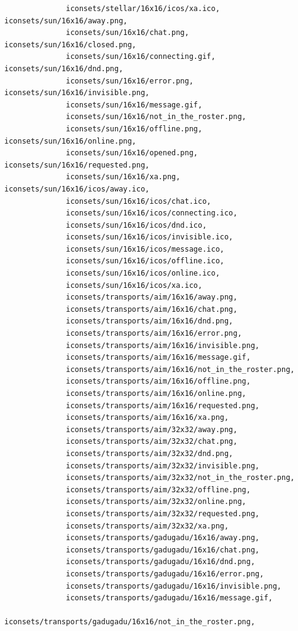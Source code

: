 \documentclass[a4paper]{article}
\begin{document}
\begin{verbatim}
              iconsets/stellar/16x16/icos/xa.ico, iconsets/sun/16x16/away.png,
              iconsets/sun/16x16/chat.png, iconsets/sun/16x16/closed.png,
              iconsets/sun/16x16/connecting.gif, iconsets/sun/16x16/dnd.png,
              iconsets/sun/16x16/error.png, iconsets/sun/16x16/invisible.png,
              iconsets/sun/16x16/message.gif,
              iconsets/sun/16x16/not_in_the_roster.png,
              iconsets/sun/16x16/offline.png, iconsets/sun/16x16/online.png,
              iconsets/sun/16x16/opened.png, iconsets/sun/16x16/requested.png,
              iconsets/sun/16x16/xa.png, iconsets/sun/16x16/icos/away.ico,
              iconsets/sun/16x16/icos/chat.ico,
              iconsets/sun/16x16/icos/connecting.ico,
              iconsets/sun/16x16/icos/dnd.ico,
              iconsets/sun/16x16/icos/invisible.ico,
              iconsets/sun/16x16/icos/message.ico,
              iconsets/sun/16x16/icos/offline.ico,
              iconsets/sun/16x16/icos/online.ico,
              iconsets/sun/16x16/icos/xa.ico,
              iconsets/transports/aim/16x16/away.png,
              iconsets/transports/aim/16x16/chat.png,
              iconsets/transports/aim/16x16/dnd.png,
              iconsets/transports/aim/16x16/error.png,
              iconsets/transports/aim/16x16/invisible.png,
              iconsets/transports/aim/16x16/message.gif,
              iconsets/transports/aim/16x16/not_in_the_roster.png,
              iconsets/transports/aim/16x16/offline.png,
              iconsets/transports/aim/16x16/online.png,
              iconsets/transports/aim/16x16/requested.png,
              iconsets/transports/aim/16x16/xa.png,
              iconsets/transports/aim/32x32/away.png,
              iconsets/transports/aim/32x32/chat.png,
              iconsets/transports/aim/32x32/dnd.png,
              iconsets/transports/aim/32x32/invisible.png,
              iconsets/transports/aim/32x32/not_in_the_roster.png,
              iconsets/transports/aim/32x32/offline.png,
              iconsets/transports/aim/32x32/online.png,
              iconsets/transports/aim/32x32/requested.png,
              iconsets/transports/aim/32x32/xa.png,
              iconsets/transports/gadugadu/16x16/away.png,
              iconsets/transports/gadugadu/16x16/chat.png,
              iconsets/transports/gadugadu/16x16/dnd.png,
              iconsets/transports/gadugadu/16x16/error.png,
              iconsets/transports/gadugadu/16x16/invisible.png,
              iconsets/transports/gadugadu/16x16/message.gif,
              iconsets/transports/gadugadu/16x16/not_in_the_roster.png,

\end{verbatim}
\end{document}
